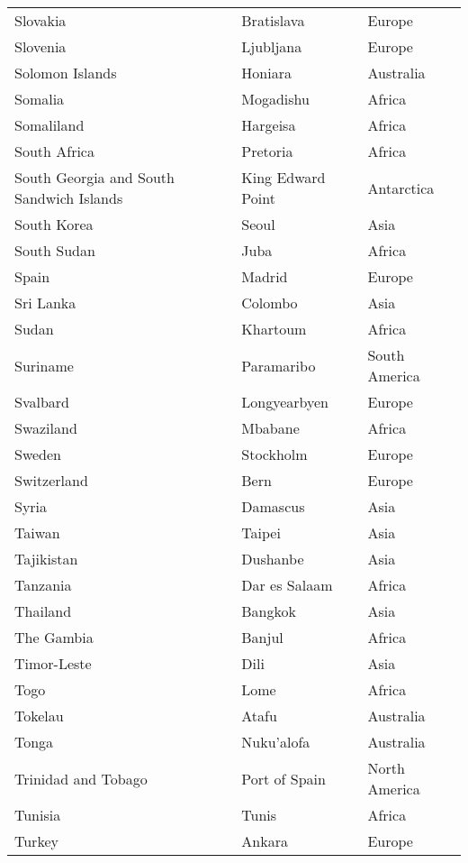 \begin{longtable}{>{\raggedright}p{}>{\centering}p{}p{}}
Slovakia        & Bratislava        & Europe\\
Slovenia        & Ljubljana         & Europe\\
Solomon Islands & Honiara           & Australia\\
Somalia         & Mogadishu	        & Africa\\
Somaliland      & Hargeisa          & Africa\\
South Africa    & Pretoria          & Africa\\
South Georgia and South Sandwich Islands & King Edward Point & Antarctica\\
South Korea     & Seoul             & Asia\\
South Sudan     & Juba              & Africa\\
Spain           & Madrid            & Europe\\
Sri Lanka       & Colombo           & Asia\\
Sudan           & Khartoum          & Africa\\
Suriname        & Paramaribo        & South America\\
Svalbard        & Longyearbyen      & Europe\\
Swaziland       & Mbabane           & Africa\\
Sweden          & Stockholm         & Europe\\
Switzerland     & Bern              & Europe\\
Syria           & Damascus          & Asia\\
Taiwan          & Taipei            & Asia\\
Tajikistan      & Dushanbe          & Asia\\
Tanzania        & Dar es Salaam     & Africa\\
Thailand        & Bangkok           & Asia\\
The Gambia      & Banjul	        & Africa\\
Timor-Leste     & Dili              & Asia\\
Togo            & Lome	            & Africa\\
Tokelau         & Atafu             & Australia\\
Tonga           & Nuku’alofa        & Australia\\
Trinidad and Tobago & Port of Spain & North America\\
Tunisia         & Tunis             & Africa\\
Turkey          & Ankara            & Europe\\

\end{longtable}
